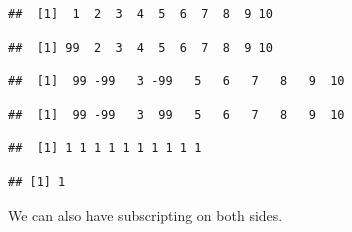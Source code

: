 \documentclass[krantz2]{krantz}\usepackage{knitr}%
\begin{document}
\begin{knitrout}\footnotesize
{}\color{fgcolor}\begin{kframe}
\begin{alltt}
 \hlkwb{<-} \hlopt{:}
\end{alltt}
\begin{verbatim}
##  [1]  1  2  3  4  5  6  7  8  9 10
\end{verbatim}
\begin{alltt}
\hlstd{a[}\hlstd{]} \hlkwb{<-} 
\end{alltt}
\begin{verbatim}
##  [1] 99  2  3  4  5  6  7  8  9 10
\end{verbatim}
\begin{alltt}
\hlstd{a[}\hlstd{(}\hlstd{,}\hlstd{)]} \hlkwb{<-} \hlopt{-} 
\end{alltt}
\begin{verbatim}
##  [1]  99 -99   3 -99   5   6   7   8   9  10
\end{verbatim}
\begin{alltt}
\hlstd{a[}\hlstd{(}\hlstd{,}\hlstd{)]} \hlkwb{<-} \hlstd{(}\hlopt{-}\hlstd{,} \hlstd{)}
\end{alltt}
\begin{verbatim}
##  [1]  99 -99   3  99   5   6   7   8   9  10
\end{verbatim}
\begin{alltt}
\hlstd{a[}\hlstd{]} \hlkwb{<-} 
\end{alltt}
\begin{verbatim}
##  [1] 1 1 1 1 1 1 1 1 1 1
\end{verbatim}
\begin{alltt}
 \hlkwb{<-} 
\end{alltt}
\begin{verbatim}
## [1] 1
\end{verbatim}
\end{kframe}
\end{knitrout}

We can also have subscripting on both sides.
\end{document}
